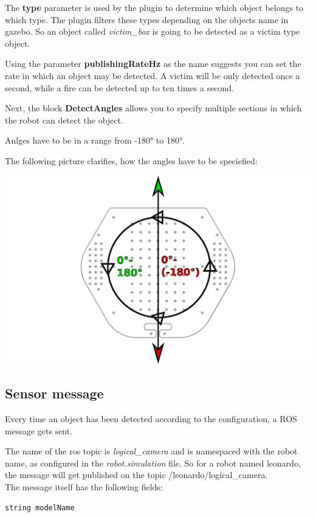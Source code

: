 The \textbf{type} parameter is used by the plugin to determine which object belongs to which type. The plugin filters these types depending on the objects name in gazebo. So an object called \textit{victim\_box} is going to be detected as a victim type object.

Using the parameter \textbf{publishingRateHz} as the name suggests you can set the rate in which an object may be detected. A victim will be only detected once a second, while a fire can be detected up to ten times a second.

Next, the block \textbf{DetectAngles} allows you to specify multiple sections in which the robot can detect the object.

Anlges have to be in a range from -180° to 180°.

The following picture clarifies, how the angles have to be speciefied:

\includegraphics[width=1.0\textwidth]{ttbangles.pdf}

\subsection{Sensor message}

Every time an object has been detected according to the configuration, a ROS message gets sent.

The name of the ros topic is \textit{logical\_camera} and is namespaced with the robot name, as configured in the \textit{robot.simulation} file. So for a robot named leonardo, the message will get published on the topic  /leonardo/logical\_camera.\\

The message itself has the following fields:

\texttt{string modelName}

